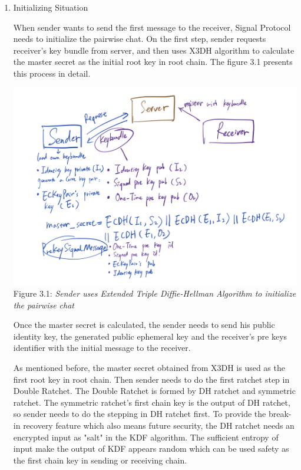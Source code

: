 \begin{enumerate}[label=(\roman*)]
\item Initializing Situation

When sender wants to send the first message to the receiver, Signal Protocol needs to initialize the pairwise chat. On the first step, sender requests receiver's key bundle from server, and then uses X3DH algorithm to calculate the master secret as the initial root key in root chain. The figure 3.1 presents this process in detail.

\begin{center}
\includegraphics[scale=.5]{../3-Background/resources/X3DH.png}\\
Figure 3.1: \textit{Sender uses Extended Triple Diffie-Hellman Algorithm to initialize the pairwise chat}
\end{center}

Once the master secret is calculated, the sender needs to send his public identity key, the generated public ephemeral key and the receiver's pre keys identifier with the initial message to the receiver.

As mentioned before, the master secret obtained from X3DH is used as the first root key in root chain. Then sender needs to do the first ratchet step in Double Ratchet. The Double Ratchet is formed by DH ratchet and symmetric ratchet. The symmetric ratchet's first chain key is the output of DH ratchet, so sender needs to do the stepping in DH ratchet first. To provide the break-in recovery feature which also means future security, the DH ratchet needs an encrypted input as "salt" in the KDF algorithm. The sufficient entropy of input make the output of KDF appears random which can be used safety as the first chain key in sending or receiving chain.


\end{enumerate}
